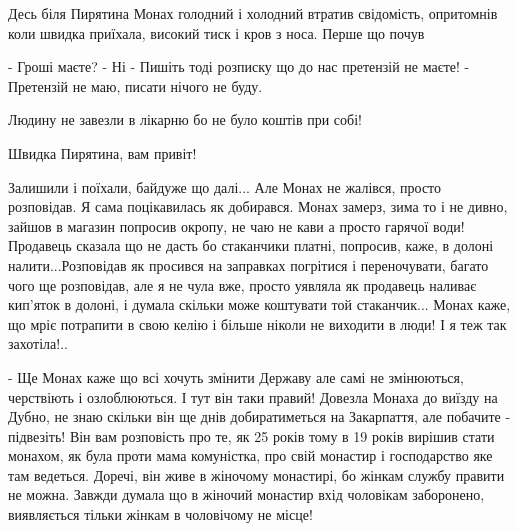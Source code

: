 Десь біля Пирятина Монах голодний і холодний втратив свідомість, опритомнів
коли швидка приїхала, високий тиск і кров з носа. Перше що почув

\obeycr
- Гроші маєте?
- Ні
- Пишіть тоді розписку що до нас претензій не маєте!
- Претензій не маю, писати нічого не буду.
\restorecr

Людину не завезли в лікарню бо не було коштів при собі! 

Швидка Пирятина, вам привіт! 

Залишили і поїхали, байдуже що далі... Але Монах не жалівся, просто розповідав.
Я сама поцікавилась як добирався. Монах замерз, зима то і не дивно, зайшов в
магазин попросив окропу, не чаю не кави а просто гарячої води! Продавець
сказала що не дасть бо стаканчики платні, попросив, каже, в долоні
налити...Розповідав як просився на заправках погрітися і переночувати, багато
чого ще розповідав, але я не чула вже, просто уявляла як продавець наливає
кип'яток в долоні, і думала скільки може коштувати той стаканчик... Монах каже,
що мріє потрапити в свою келію і більше ніколи не виходити в люди! І я теж так
захотіла!..

- Ще Монах каже що всі хочуть змінити Державу але самі не змінюються,
черствіють і озлоблюються. І тут він таки правий! Довезла Монаха до виїзду на
Дубно, не знаю скільки він ще днів добиратиметься на Закарпаття, але побачите -
підвезіть! Він вам розповість про те, як 25 років тому в 19 років вирішив стати
монахом, як була проти мама комуністка, про свій монастир і господарство яке
там ведеться. Доречі, він живе в жіночому монастирі, бо жінкам службу правити
не можна. Завжди думала що в жіночий монастир вхід чоловікам заборонено,
виявляється тільки жінкам в чоловічому не місце!
